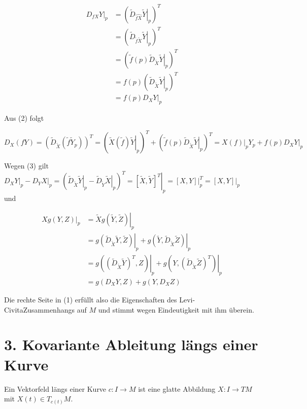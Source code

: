 \documentclass[10pt, letterpaper]{article}
\begin{document}
$$
\begin{aligned}
\left.D_{f X} Y\right|_{p} & =\left(\left.\tilde{D}_{\wideparen{f X}} \tilde{Y}\right|_{p}\right)^{T} \\
& =\left(\left.\tilde{D}_{\tilde{f} \tilde{X}} \tilde{Y}\right|_{p}\right)^{T} \\
& =\left(\left.\tilde{f}(p) \tilde{D}_{\tilde{X}} \tilde{Y}\right|_{p}\right)^{T} \\
& =f(p)\left(\left.\tilde{D}_{\tilde{X}} \tilde{Y}\right|_{p}\right)^{T} \\
& =\left.f(p) D_{X} Y\right|_{p}
\end{aligned}
$$

Aus (2) folgt

$$
D_{X}(f Y)=\left(\tilde{D}_{\tilde{X}}\left(\tilde{f} \tilde{Y}_{p}\right)\right)^{T}=\left(\left.\tilde{X}(\tilde{f}) \tilde{Y}\right|_{p}\right)^{T}+\left(\left.\tilde{f}(p) \tilde{D}_{\tilde{X}} \tilde{Y}\right|_{p}\right)^{T}=\left.X(f)\right|_{p} Y_{p}+\left.f(p) D_{X} Y\right|_{p}
$$

Wegen (3) gilt\\
$\left.D_{X} Y\right|_{p}-\left.D_{Y} X\right|_{p}=\left(\left.\tilde{D}_{\tilde{X}} \tilde{Y}\right|_{p}-\left.\tilde{D}_{\tilde{Y}} \tilde{X}\right|_{p}\right)^{T}=\left.[\tilde{X}, \tilde{Y}]^{T}\right|_{p}=\left.[X, Y]\right|_{p} ^{T}=\left.[X, Y]\right|_{p}$\\
und

$$
\begin{aligned}
\left.X g(Y, Z)\right|_{p} & =\left.\tilde{X} g(\tilde{Y}, \tilde{Z})\right|_{p} \\
& =\left.g\left(\tilde{D}_{\tilde{X}} \tilde{Y}, \tilde{Z}\right)\right|_{p}+\left.g\left(\tilde{Y}, \tilde{D}_{\tilde{X}} \tilde{Z}\right)\right|_{p} \\
& =\left.g\left(\left(\tilde{D}_{\tilde{X}} \tilde{Y}\right)^{T}, Z\right)\right|_{p}+\left.g\left(Y,\left(\tilde{D}_{\tilde{X}} \tilde{Z}\right)^{T}\right)\right|_{p} \\
& =g\left(D_{X} Y, Z\right)+g\left(Y, D_{X} Z\right)
\end{aligned}
$$

Die rechte Seite in (1) erfüllt also die Eigenschaften des Levi-CivitaZusammenhangs auf $M$ und stimmt wegen Eindeutigkeit mit ihm überein.

\section*{3. Kovariante Ableitung längs einer Kurve}
Ein Vektorfeld längs einer Kurve $c: I \rightarrow M$ ist eine glatte Abbildung $X: I \rightarrow T M$ mit $X(t) \in T_{c(t)} M$.
\end{document}
